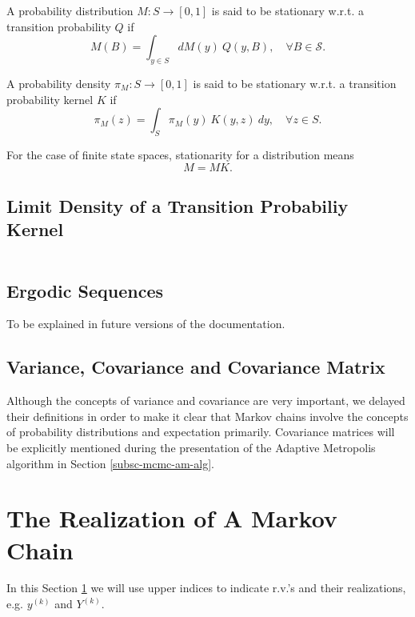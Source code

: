 A probability distribution $M:S\rightarrow [0,1]$ is said to be stationary w.r.t. a transition probability $Q$ if
\begin{equation*}
M(B) = \int_{y\in S}dM(y)~Q(y,B),\quad\forall B\in\mathcal{S}.
\end{equation*}

A probability density $\pi_M:S\rightarrow [0,1]$ is said to be stationary w.r.t. a transition probability kernel $K$ if
\begin{equation}\label{eq-stationary-density}
\pi_M(z) = \int_{S}\pi_M(y)~K(y,z)~dy,\quad\forall z\in S.
\end{equation}

For the case of finite state spaces, stationarity for a distribution means
\begin{equation*}
M = MK.
\end{equation*}

\subsection{Limit Density of a Transition Probabiliy Kernel}
$~$\\

\subsection{Ergodic Sequences}

To be explained in future versions of the documentation.

\subsection{Variance, Covariance and Covariance Matrix}

Although the concepts of variance and covariance are very important, we delayed their definitions in order to make it clear that Markov chains involve the concepts of probability distributions and expectation primarily.
Covariance matrices will be explicitly mentioned during the presentation of the Adaptive Metropolis algorithm in Section \ref{subsc-mcmc-am-alg}.

\section{The Realization of A Markov Chain}\label{sc-mcmc-realization-of-a-markov-chain}

In this Section \ref{sc-mcmc-realization-of-a-markov-chain}
we will use upper indices to indicate r.v.'s and their realizations, e.g. $y^{(k)}$ and $Y^{(k)}$.

